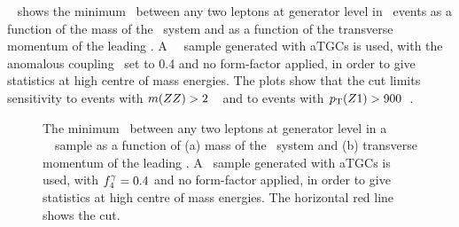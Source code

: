 ~ shows the minimum \deltaR\ between any two leptons
at generator level in \fourlep\ events as a function of the
mass of the \fourlep\ system and as a function of the transverse momentum of the
leading \Z. A \ZZllll\ \mc\ sample generated with aTGCs is used, with the
anomalous coupling \ffourg\ set to 0.4
and no form-factor applied, in order to give statistics at high centre of mass
energies. The plots show that the  cut limits sensitivity to
events with $m(ZZ)>2$~\tev\ and to events with $p_{\mathrm{T}}(Z1)>900$~\gev.

\begin{figure}[h]
\centering
    \caption[Effect of the  requirement on sensitivity to boosted
    \fourlep\ systems.]{The minimum \deltaR\ between any two leptons at
    generator level in a \fourlep\
    \mc\ sample as a function of (a) mass of the
    \fourlep\ system and (b) transverse momentum of the leading \Z. A \ZZllll\
    sample generated with aTGCs is used, with $f_{4}^{\gamma}=0.4$ and no form-factor
    applied, in order to give statistics at high centre
    of mass energies. The
    horizontal red line shows the \deltaRlt{0.2} cut. }
\label{fig:objSel-deltaRcutoff} 
\end{figure}

